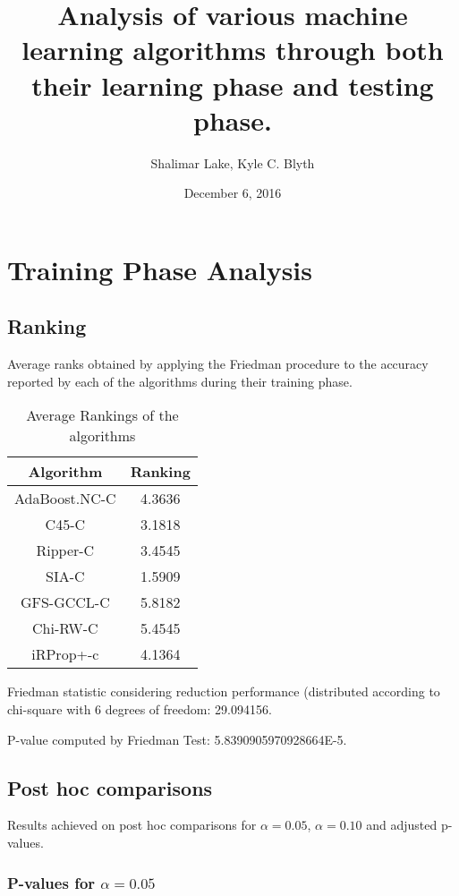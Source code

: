 \documentclass[a4paper,10pt]{article}
\title{Analysis of various machine learning algorithms through both their learning phase and testing phase.}
\author{Shalimar Lake, Kyle C. Blyth}
\date{December 6, 2016}
\begin{document}
\pagestyle{empty}
\maketitle
\thispagestyle{empty}
\section{Training Phase Analysis}



\subsection {Ranking}
Average ranks obtained by applying the Friedman procedure to the accuracy reported by each of the algorithms during their training phase.

\begin{table}[!htp]
\centering
\begin{tabular}{|c|c|}\hline
Algorithm&Ranking\\\hline
AdaBoost.NC-C & 4.3636\\
C45-C & 3.1818\\
Ripper-C & 3.4545\\
SIA-C & 1.5909\\
GFS-GCCL-C & 5.8182\\
Chi-RW-C & 5.4545\\
iRProp+-c & 4.1364\\
\hline
\end{tabular}
\caption{Average Rankings of the algorithms}
\end{table}

Friedman statistic considering reduction performance (distributed according to chi-square with 6 degrees of freedom: 29.094156.

P-value computed by Friedman Test: 5.8390905970928664E-5.\newline



\pagebreak

\subsection{Post hoc comparisons}

Results achieved on post hoc comparisons for $\alpha = 0.05$, $\alpha = 0.10$ and adjusted p-values.

\subsubsection{P-values for $\alpha=0.05$}
\end{document}
